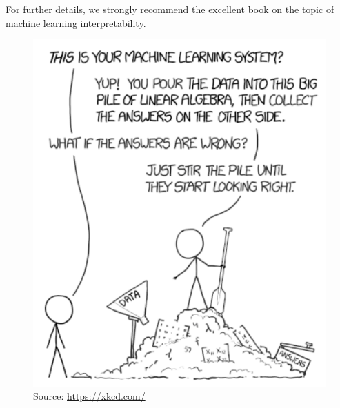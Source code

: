   \par For further details, we strongly recommend the excellent book \citep{molnar2019} on the topic of machine learning interpretability.

  \begin{figure}[!htbp]
    \centering
    \includegraphics[scale=0.5]{images/introduction/current_ml_tradition.png}
    \caption{Source: \url{https://xkcd.com/}}
    \label{fig:current_ml_comic}
  \end{figure}


